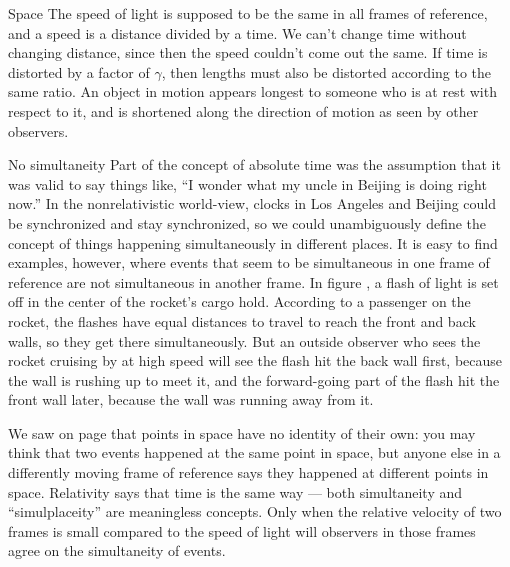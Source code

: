 \begin{envsubsection}{Space}
The speed of light is supposed to be the same in all frames of reference,
and a speed is a distance divided by a time. We can't change time without
changing distance, since then the speed couldn't come out the same.
If time is distorted by a factor of $\gamma$, then lengths must also be distorted
according to the same ratio. An object in motion appears longest to someone
who is at rest with respect to it, and is shortened along the direction of motion
as seen by other observers.
\end{envsubsection}
%
\begin{envsubsection}{No simultaneity}
Part of the concept of absolute time was the assumption that
it was valid to say things like, ``I wonder what my uncle in
Beijing is doing right now.'' In the nonrelativistic
world-view, clocks in Los Angeles and Beijing could be
synchronized and stay synchronized, so we could
unambiguously define the concept of things happening
simultaneously in different places. It is easy to find
examples, however, where events that seem to be simultaneous
in one frame of reference are not simultaneous in another
frame. In figure , a flash of light is set off in
the center of the rocket's cargo hold. According to a
passenger on the rocket, the flashes have equal distances to
travel to reach the front and back walls, so they get there
simultaneously. But an outside observer who sees the rocket
cruising by at high speed will see the flash hit the back
wall first, because the wall is rushing up to meet it, and
the forward-going part of the flash hit the front wall
later, because the wall was running away from it. 


We saw on page \pageref{points-in-space-have-no-identity} that
points in space have no identity of their own: you may think
that two events happened at the same point in space, but
anyone else in a differently moving frame of reference says they
happened at different points in space. Relativity says that time
is the same way --- both simultaneity and ``simulplaceity'' are meaningless
concepts. Only when
the relative velocity of two frames is small compared to the
speed of light will observers in those frames agree on the
simultaneity of events. 



\end{envsubsection}
